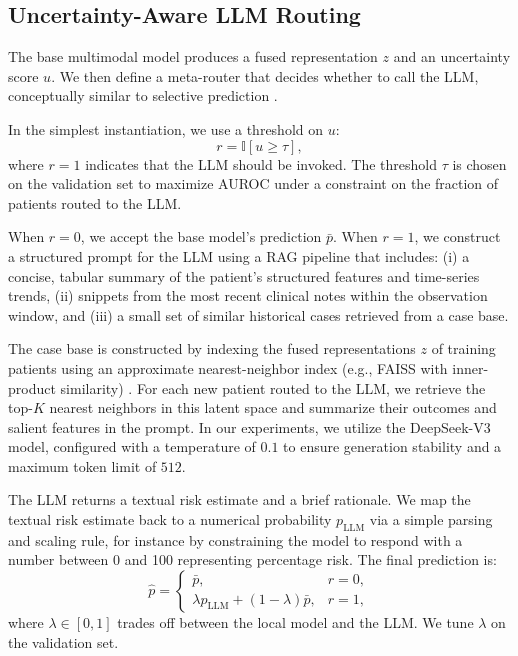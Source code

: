 \documentclass{article}
\begin{document}
\subsection{Uncertainty-Aware LLM Routing}

The base multimodal model produces a fused representation $z$ and an uncertainty score $u$. 
We then define a meta-router that decides whether to call the LLM, conceptually similar to selective prediction \cite{Geifman2017SelectiveClassification}. 

In the simplest instantiation, we use a threshold on $u$: 
\begin{equation} 
  r = \mathbb{I}[u \geq \tau], 
\end{equation} 
where $r{=}1$ indicates that the LLM should be invoked. 
The threshold $\tau$ is chosen on the validation set to maximize AUROC under a constraint on the fraction of patients routed to the LLM. 

When $r{=}0$, we accept the base model's prediction $\bar{p}$. 
When $r{=}1$, we construct a structured prompt for the LLM using a RAG pipeline \cite{Lewis2020RAG} that includes: 
(i) a concise, tabular summary of the patient's structured features and time-series trends, 
(ii) snippets from the most recent clinical notes within the observation window, 
and (iii) a small set of similar historical cases retrieved from a case base. 

The case base is constructed by indexing the fused representations $z$ of training patients using an approximate nearest-neighbor index (e.g., FAISS with inner-product similarity) \cite{King2023MultimodalPretrain}. 
For each new patient routed to the LLM, we retrieve the top-$K$ nearest neighbors in this latent space and summarize their outcomes and salient features in the prompt. 
In our experiments, we utilize the DeepSeek-V3 model, configured with a temperature of $0.1$ to ensure generation stability and a maximum token limit of $512$.

The LLM returns a textual risk estimate and a brief rationale. 
We map the textual risk estimate back to a numerical probability $p_{\text{LLM}}$ via a simple parsing and scaling rule, for instance by constraining the model to respond with a number between 0 and 100 representing percentage risk. 
The final prediction is: 
\begin{equation} 
  \hat{p} = 
  \begin{cases} 
    \bar{p}, & r = 0, \\ 
    \lambda p_{\text{LLM}} + (1-\lambda)\bar{p}, & r = 1, 
  \end{cases} 
\end{equation} 
where $\lambda \in [0,1]$ trades off between the local model and the LLM. 
We tune $\lambda$ on the validation set.
%
\end{document}
